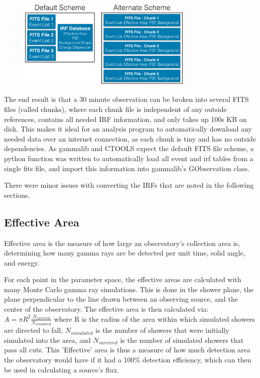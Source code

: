\begin{figure}[ht]
  \begin{center}
    \includegraphics[width=0.75\textwidth]{images/FITS_diagrams_alternate_scheme.eps}
    \caption[FITS File Event Storage Schemes]{}\label{fig:fits_scheme}
  \end{center}
\end{figure}

The end result is that a 30 minute observation can be broken into several FITS files (called chunks), where each chunk file is independent of any outside references, contains all needed IRF information, and only takes up \nicetilde100s KB on disk.
This makes it ideal for an analysis program to automatically download any needed data over an internet connection, as each chunk is tiny and has no outside dependencies.
As gammalib and CTOOLS expect the default FITS file scheme, a python function was written to automatically load all event and irf tables from a single fits file, and import this information into gammalib's GObservation class.

There were minor issues with converting the IRFs that are noted in the following sections.

\subsection{Effective Area}\label{subsec:effarea}
Effective area is the measure of how large an observatory's collection area is, determining how many gamma rays are be detected per unit time, solid angle, and energy.

For each point in the parameter space, the effective areas are calculated with many Monte Carlo gamma ray simulations.
This is done in the shower plane, the plane perpendicular to the line drawn between an observing source, and the center of the observatory.
The effective area is then calculated via:
$A=\pi R^2 \frac{N_{survived}}{N_{simulated}}$
where R is the radius of the area within which simulated showers are directed to fall, $N_{simulated}$ is the number of showers that were initially simulated into the area, and $N_{survived}$ is the number of simulated showers that pass all cuts.
This 'Effective' area is thus a measure of how much detection area the observatory would have if it had a 100\% detection efficiency, which can then be used in calculating a source's flux.

